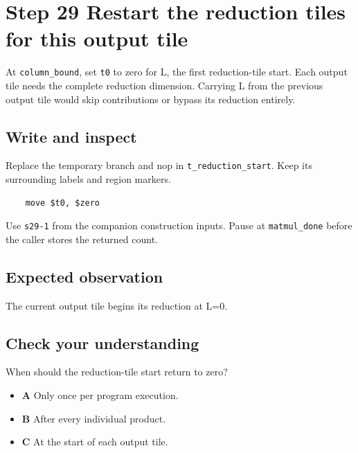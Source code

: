 \section{Step 29 Restart the reduction tiles for this output tile}\label{matmul-s29}

At \texttt{column\_bound}, set \texttt{t0} to zero for L, the first reduction-tile start. Each output tile needs the complete reduction dimension. Carrying L from the previous output tile would skip contributions or bypass its reduction entirely.

\subsection{Write and inspect}
Replace the temporary branch and nop in \texttt{t\_reduction\_start}. Keep its surrounding labels and region markers.

\begin{verbatim}
    move $t0, $zero
\end{verbatim}
Use \texttt{s29-1} from the companion construction inputs. Pause at \texttt{matmul\_done} before the caller stores the returned count.

\subsection{Expected observation}
The current output tile begins its reduction at L=0.

\subsection{Check your understanding}
When should the reduction-tile start return to zero?

\begin{itemize}
  \item \textbf{A} Only once per program execution.
  \item \textbf{B} After every individual product.
  \item \textbf{C} At the start of each output tile.
\end{itemize}
